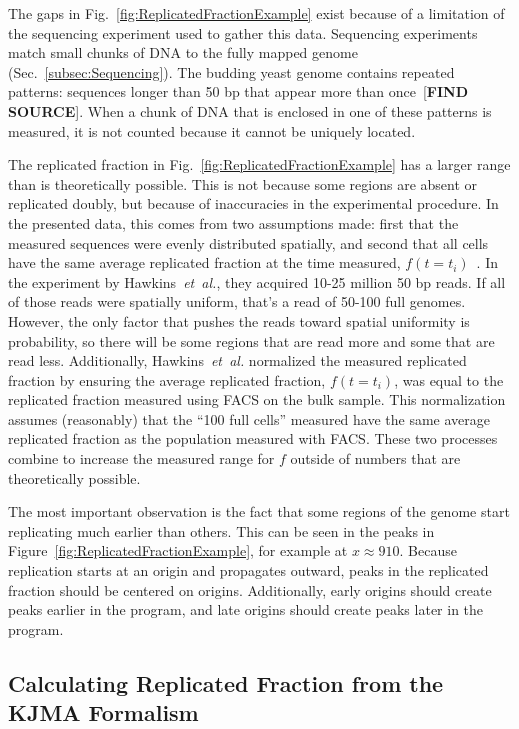		The gaps in Fig.~\ref{fig:ReplicatedFractionExample} exist because of a limitation of the sequencing experiment used to gather this data.
		Sequencing experiments match small chunks of DNA to the fully mapped genome (Sec.~\ref{subsec:Sequencing}).
		The budding yeast genome contains repeated patterns: sequences longer than 50 bp that appear more than once~[\textbf{FIND SOURCE}].
		When a chunk of DNA that is enclosed in one of these patterns is measured, it is not counted because it cannot be uniquely located.
		
		The replicated fraction in Fig.~\ref{fig:ReplicatedFractionExample} has a larger range than is theoretically possible.
		This is not because some regions are absent or replicated doubly, but because of inaccuracies in the experimental procedure.
		In the presented data, this comes from two assumptions made: first that the measured sequences were evenly distributed spatially, and second that all cells have the same average replicated fraction at the time measured, $f(t=t_i)$~\cite{StochasticTermination}.
		In the experiment by Hawkins~\emph{et~al.}, they acquired 10-25 million 50 bp reads.
		If all of those reads were spatially uniform, that's a read of 50-100 full genomes.
		However, the only factor that pushes the reads toward spatial uniformity is probability, so there will be some regions that are read more and some that are read less.
		Additionally, Hawkins~\emph{et~al.} normalized the measured replicated fraction by ensuring the average replicated fraction, $f(t=t_i)$, was equal to the replicated fraction measured using FACS on the bulk sample.
		This normalization assumes (reasonably) that the ``100 full cells'' measured have the same average replicated fraction as the population measured with FACS.
		These two processes combine to increase the measured range for $f$ outside of numbers that are theoretically possible.
		
		The most important observation is the fact that some regions of the genome start replicating much earlier than others.
		This can be seen in the peaks in Figure~\ref{fig:ReplicatedFractionExample}, for example at $x \approx 910$.
		Because replication starts at an origin and propagates outward, peaks in the replicated fraction should be centered on origins.
		Additionally, early origins should create peaks earlier in the program, and late origins should create peaks later in the program.
		
		
		\subsection{Calculating Replicated Fraction from the KJMA Formalism}
		\label{subsec:KJMA}
		

